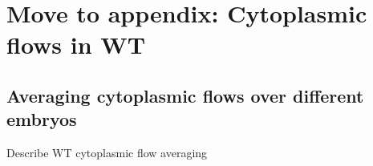 \section{Move to appendix: Cytoplasmic flows in WT} 



\subsection{Averaging cytoplasmic flows over different embryos}

Describe WT cytoplasmic flow averaging